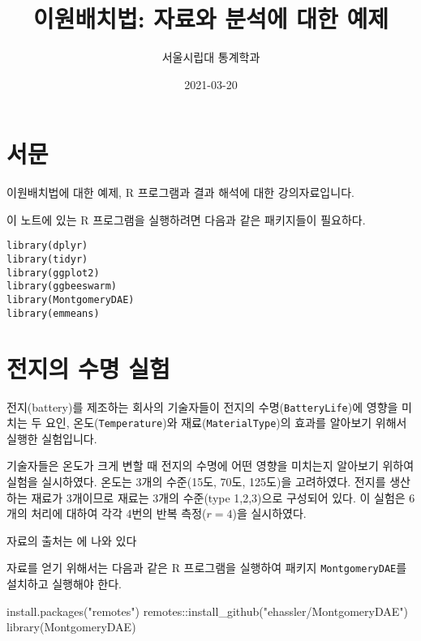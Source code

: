 \documentclass[
]{book}
\title{이원배치법: 자료와 분석에 대한 예제}
\author{서울시립대 통계학과}
\date{2021-03-20}
\newenvironment{Shaded}{\begin{snugshade}}{\end{snugshade}}
\newcommand{\FunctionTok}[1]{\textcolor[rgb]{0.00,0.00,0.00}{#1}}
\newcommand{\NormalTok}[1]{#1}
\newcommand{\SpecialCharTok}[1]{\textcolor[rgb]{0.00,0.00,0.00}{#1}}
\newcommand{\StringTok}[1]{\textcolor[rgb]{0.31,0.60,0.02}{#1}}
\begin{document}
\maketitle

{
\setcounter{tocdepth}{1}
\tableofcontents
}
\hypertarget{uxc11cuxbb38}{%
\chapter*{서문}\label{uxc11cuxbb38}}


이원배치법에 대한 예제, R 프로그램과 결과 해석에 대한 강의자료입니다.

이 노트에 있는 R 프로그램을 실행하려면 다음과 같은 패키지들이 필요하다.

\begin{verbatim}
library(dplyr)
library(tidyr)
library(ggplot2)
library(ggbeeswarm)
library(MontgomeryDAE)
library(emmeans)
\end{verbatim}

\mainmatter

\hypertarget{battery}{%
\chapter{전지의 수명 실험}\label{battery}}

전지(battery)를 제조하는 회사의 기술자들이 전지의 수명(\texttt{BatteryLife})에 영향을 미치는 두 요인, 온도(\texttt{Temperature})와 재료(\texttt{MaterialType})의 효과를 알아보기 위해서 실행한 실험입니다.

기술자들은 온도가 크게 변할 때 전지의 수명에 어떤 영향을 미치는지 알아보기 위하여 실험을 실시하였다. 온도는 3개의 수준(15도, 70도, 125도)을 고려하였다. 전지를 생산하는 재료가 3개이므로 재료는 3개의 수준(type 1,2,3)으로 구성되어 있다. 이 실험은 6개의 처리에 대하여 각각 4번의 반복 측정(\(r=4\))을 실시하였다.

자료의 출처는 \citep{montgomery2017design} 에 나와 있다

자료를 얻기 위해서는 다음과 같은 R 프로그램을 실행하여 패키지 \texttt{MontgomeryDAE}를 설치하고 실행해야 한다.

\begin{Shaded}
\begin{Highlighting}[]
\FunctionTok{install.packages}\NormalTok{(}\StringTok{"remotes"}\NormalTok{)}
\NormalTok{remotes}\SpecialCharTok{::}\FunctionTok{install\_github}\NormalTok{(}\StringTok{"ehassler/MontgomeryDAE"}\NormalTok{)}
\FunctionTok{library}\NormalTok{(MontgomeryDAE)}
\end{Highlighting}
\end{Shaded}
\end{document}
